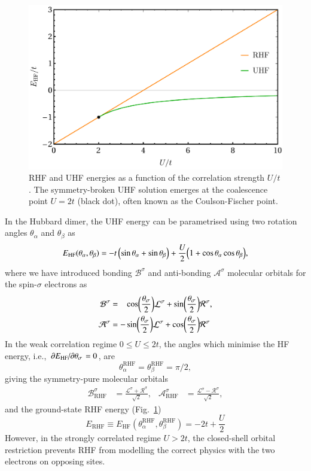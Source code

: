 \documentclass[aps,prb,reprint,noshowkeys,linenumbers,superscriptaddress]{revtex4-1}
\newcommand{\latin}[1]{#1}
\newcommand{\ie}{\latin{i.e.}}
\newcommand{\ta}{\theta_{\alpha}}
\newcommand{\tb}{\theta_{\beta}}
\newcommand{\Lsi}{\mathcal{L}^{\sigma}}
\newcommand{\Rsi}{\mathcal{R}^{\sigma}}
\begin{document}
\begin{figure}
    \includegraphics[width=\linewidth]{HF_real.pdf}
    \caption{\label{fig:HF_real}
    RHF and UHF energies as a function of the correlation strength $U/t$. 
    The symmetry-broken UHF solution emerges at the coalescence point $U=2t$ (black dot), often known as the Coulson-Fischer point.}
\end{figure}

In the Hubbard dimer, the UHF energy can be parametrised using two rotation angles $\ta$ and $\tb$ as
\begin{equation}
E_\text{HF}(\ta, \tb) = -t\, \qty( \sin \ta + \sin \tb ) + \frac{U}{2} \qty( 1 + \cos \ta \cos \tb ),
\end{equation}
where we have introduced bonding $\mathcal{B}^{\sigma}$ and anti-bonding $\mathcal{A}^{\sigma}$ molecular orbitals for 
the spin-$\sigma$ electrons as
\begin{align}
    \mathcal{B}^{\sigma} & = \hphantom{-} \cos(\frac{\theta_\sigma}{2}) \Lsi + \sin(\frac{\theta_\sigma}{2}) \Rsi,
	\\
	\mathcal{A}^{\sigma} & = - \sin(\frac{\theta_\sigma}{2}) \Lsi + \cos(\frac{\theta_\sigma}{2}) \Rsi
\end{align}
In the weak correlation regime $0 \le U \le 2t$, the angles which minimise the HF energy, 
\ie, $\pdv*{E_\text{HF}}{\theta_\sigma} = 0$, are 
\begin{equation}
	\ta^\text{RHF} = \tb^\text{RHF} = \pi/2,
\end{equation}
giving the symmetry-pure molecular orbitals
\begin{align}
	\mathcal{B}_\text{RHF}^{\sigma} & = \frac{\Lsi + \Rsi}{\sqrt{2}},
	&
	\mathcal{A}_\text{RHF}^{\sigma} & = \frac{\Lsi - \Rsi}{\sqrt{2}},
\end{align}
and the ground-state RHF energy (Fig.~\ref{fig:HF_real})
\begin{equation}
	E_\text{RHF} \equiv E_\text{HF}(\ta^\text{RHF}, \tb^\text{RHF}) = -2t + \frac{U}{2}
\end{equation}
However, in the strongly correlated regime $U>2t$, the closed-shell orbital restriction prevents RHF from 
modelling the correct physics with the two electrons on opposing sites.
\end{document}
